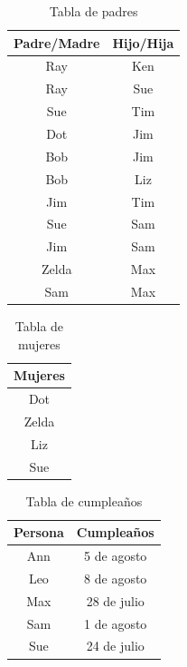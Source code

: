 \documentclass[12pt,a4paper]{book}
\begin{document}
    \begin{table}[htbp]
        \centering
        \caption{Tabla de padres}
        \renewcommand{\arraystretch}{1.3}
        \begin{tabular}{c c}
            Padre/Madre & Hijo/Hija\\
            \hline
            Ray & Ken\\
            Ray & Sue\\
            Sue & Tim\\
            Dot & Jim\\
            Bob & Jim\\
            Bob & Liz\\
            Jim & Tim\\
            Sue & Sam\\
            Jim & Sam\\
            Zelda & Max\\
            Sam & Max\\
        \end{tabular}
    \end{table}

    \begin{table}[htbp]
        \centering
        \caption{Tabla de mujeres}
        \renewcommand{\arraystretch}{1.3}
        \begin{tabular}{c}
            Mujeres\\
            \hline
            Dot\\
            Zelda\\
            Liz\\
            Sue\\
        \end{tabular}
    \end{table}

    \begin{table}[htbp]
        \centering
        \caption{Tabla de cumpleaños}
        \renewcommand{\arraystretch}{1.3}
        \begin{tabular}{c c}
            Persona & Cumpleaños\\
            \hline
            Ann & 5 de agosto\\
            Leo & 8 de agosto\\
            Max & 28 de julio\\
            Sam & 1 de agosto\\
            Sue & 24 de julio\\
        \end{tabular}
    \end{table}
\end{document}
